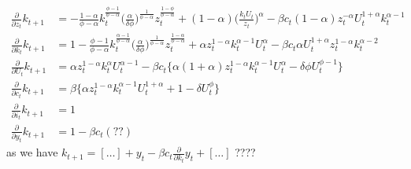 \documentclass[a4paper]{article}
\theoremstyle{definition}
\begin{document}
	\begin{align*}
	\frac{\partial}{\partial z_t}k_{t+1} 	&= - \frac{1-\alpha}{\phi-\alpha}k_t^{\frac{\phi-1}{\phi-\alpha}}\Big( \frac{\alpha}{\delta\phi} \Big)^{\frac{1}{\phi-\alpha}}z_t^{\frac{1-\phi}{\phi-\alpha}}+(1-\alpha)\Big( \frac{k_t U_t}{z_t} \Big)^{\alpha} - \beta c_t (1-\alpha)z_t^{-\alpha} U_t^{1+\alpha}k_t^{\alpha-1} \\
	\frac{\partial}{\partial k_t}k_{t+1}	&= 1 - \frac{\phi-1}{\phi-\alpha}k_t^{\frac{\alpha-1}{\phi-\alpha}}\Big(\frac{\alpha}{\delta\phi}\Big)^{\frac{1}{\phi-\alpha}}z_t^{\frac{1-\alpha}{\phi-\alpha}} + \alpha z_t^{1-\alpha}k_t^{\alpha-1}U_t^\alpha - \beta c_t \alpha U_t^{1+\alpha} z_t^{1-\alpha}k_t^{\alpha-2} \\
	\frac{\partial}{\partial U_t}k_{t+1}	&= \alpha z_t^{1-\alpha}k_t^{\alpha} U_t^{\alpha-1} - \beta c_t \bigg\{ \alpha(1+\alpha)z_t^{1-\alpha}k_t^{\alpha-1} U_t^{\alpha}- \delta \phi U_t^{\phi-1} \bigg\} \\
	\frac{\partial}{\partial c_t}k_{t+1} 	&= \beta \bigg\{ \alpha z_t^{1-\alpha}k_t^{\alpha-1}U_t^{1+\alpha}+1-\delta U_t^\phi \bigg\} \\
	\frac{\partial}{\partial i_t}k_{t+1}	&= 1\\
	\frac{\partial}{\partial y_t}k_{t+1}	&= 1-\beta c_t (??)
	\end{align*}
as we have $k_{t+1} = [\dots]+y_t - \beta c_t \frac{\partial}{\partial k_t}y_t + [\dots]$	????
\end{document}
